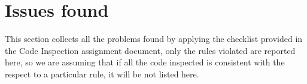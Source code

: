 \newpage
\section{Issues found}
This section collects all the problems found by applying the checklist provided in the Code Inspection assignment document, only the rules violated are reported here, so we are assuming that if all the code inspected is consistent with the respect to a particular rule, it will be not listed here.